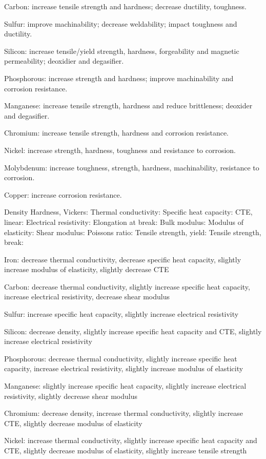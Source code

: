 \documentclass[10pt,aps,prb,amsmath,amssymb,twocolumn,letterpaper,nobalancelastpage,final,citeautoscript,floatfix,raggedbottom,superscriptaddress]{revtex4-1}
\begin{document}
Carbon: increase tensile strength and hardness; decrease ductility, toughness.

Sulfur: improve machinability; decrease weldability; impact toughness and ductility.


Silicon: increase tensile/yield strength, hardness, forgeability and magnetic permeability; deoxidier and degasifier.

Phosphorous: increase strength and hardness; improve machinability and corrosion resistance.

Manganese: increase tensile strength, hardness and reduce brittleness; deoxider and degasifier.

Chromium: increase tensile strength, hardness and corrosion resistance.

Nickel: increase strength, hardness, toughness and resistance to corrosion.

Molybdenum: increase toughness, strength, hardness, machinability, resistance to corrosion.

Copper: increase corrosion resistance.

Density
Hardness, Vickers:
Thermal conductivity:
Specific heat capacity:
CTE, linear:
Electrical resistivity:
Elongation at break:
Bulk modulus:
Modulus of elasticity:
Shear modulus:
Poissons ratio:
Tensile strength, yield:
Tensile strength, break:


Iron: decrease thermal conductivity, decrease specific heat capacity, slightly increase modulus of elasticity, slightly decrease CTE

Carbon: decrease thermal conductivity, slightly increase specific heat capacity, increase electrical resistivity, decrease shear modulus

Sulfur: increase specific heat capacity, slightly increase electrical resistivity

Silicon: decrease density, slightly increase specific heat capacity and CTE, slightly increase electrical resistivity

Phosphorous: decrease thermal conductivity, slightly increase specific heat capacity, increase electrical resistivity, slightly increase modulus of elasticity

Manganese: slightly increase specific heat capacity, slightly increase electrical resistivity, slightly decrease shear modulus

Chromium: decrease density, increase thermal conductivity, slightly increase CTE, slightly decrease modulus of elasticity

Nickel: increase thermal conductivity, slightly increase specific heat capacity and CTE, slightly decrease modulus of elasticity, slightly increase tensile strength
\end{document}
